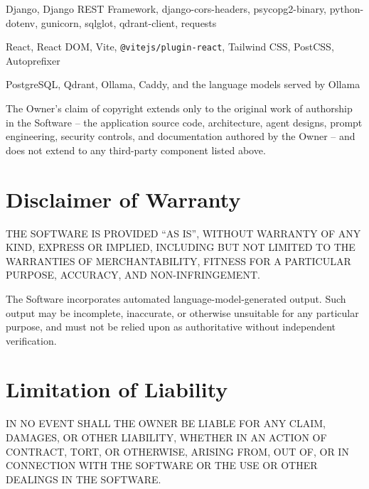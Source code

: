 \documentclass[11pt,a4paper]{article}
\begin{document}
\begin{description}[leftmargin=2em, style=nextline]
    \item[Backend \textit{(see backend/requirements.txt)}]
    Django, Django REST Framework, django-cors-headers, psycopg2-binary,
    python-dotenv, gunicorn, sqlglot, qdrant-client, requests

    \item[Frontend \textit{(see frontend/package.json)}]
    React, React DOM, Vite, \texttt{@vitejs/plugin-react}, Tailwind CSS,
    PostCSS, Autoprefixer

    \item[Container images \textit{(see docker-compose.yml)}]
    PostgreSQL, Qdrant, Ollama, Caddy, and the language models served by
    Ollama
\end{description}

The Owner's claim of copyright extends only to the original work of
authorship in the Software -- the application source code, architecture,
agent designs, prompt engineering, security controls, and documentation
authored by the Owner -- and does not extend to any third-party component
listed above.

\section{Disclaimer of Warranty}

THE SOFTWARE IS PROVIDED ``AS IS'', WITHOUT WARRANTY OF ANY KIND, EXPRESS OR
IMPLIED, INCLUDING BUT NOT LIMITED TO THE WARRANTIES OF MERCHANTABILITY,
FITNESS FOR A PARTICULAR PURPOSE, ACCURACY, AND NON-INFRINGEMENT.

The Software incorporates automated language-model-generated output. Such
output may be incomplete, inaccurate, or otherwise unsuitable for any
particular purpose, and must not be relied upon as authoritative without
independent verification.

\section{Limitation of Liability}

IN NO EVENT SHALL THE OWNER BE LIABLE FOR ANY CLAIM, DAMAGES, OR OTHER
LIABILITY, WHETHER IN AN ACTION OF CONTRACT, TORT, OR OTHERWISE, ARISING
FROM, OUT OF, OR IN CONNECTION WITH THE SOFTWARE OR THE USE OR OTHER
DEALINGS IN THE SOFTWARE.
\end{document}
